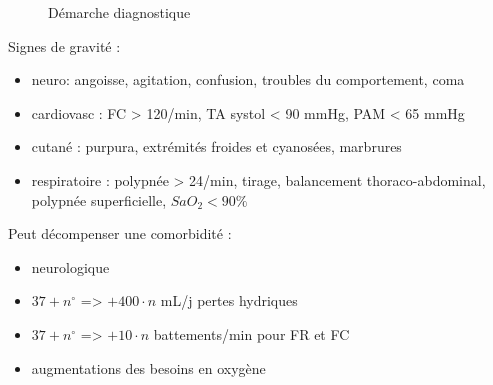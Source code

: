 \begin{figure}[htpb]
  \centering
  \caption{Démarche diagnostique}
\end{figure}

Signes de gravité :

\begin{itemize}
\item
  neuro: angoisse, agitation, confusion, troubles du comportement, coma
\item
  cardiovasc : FC > 120/min, TA systol < 90 mmHg,
  PAM < 65 mmHg
\item
  cutané : purpura, extrémités froides et cyanosées, marbrures
\item
  respiratoire : polypnée > 24/min, tirage, balancement
  thoraco-abdominal, polypnée superficielle, \(SaO_2 < 90 \%\)
\end{itemize}

Peut décompenser une comorbidité :

\begin{itemize}
\tightlist
\item
  neurologique
\item
  \(37 + n^\circ\) =\textgreater{} \(+400\cdot n\) mL/j pertes hydriques
\item
  \(37 + n^\circ\) =\textgreater{} \(+10 \cdot n\) battements/min pour
  FR et FC
\item
  augmentations des besoins en oxygène
\end{itemize}

